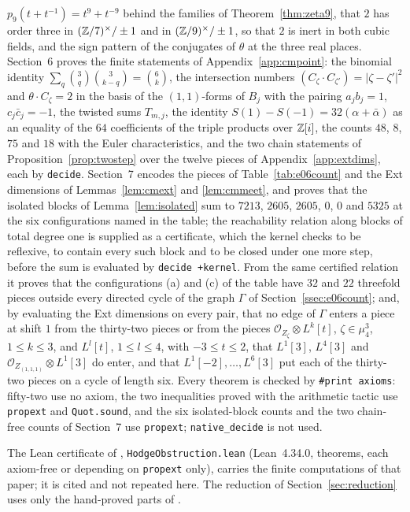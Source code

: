 $p_{9}(t+t^{-1})=t^{9}+t^{-9}$ behind the families of Theorem~\ref{thm:zeta9}, that $2$ has order three in $(\mathbb{Z}/7)^{\times}/\pm1$ and in $(\mathbb{Z}/9)^{\times}/\pm1$, so that $2$ is inert in both cubic fields, and the sign pattern of the conjugates of $\theta$ at the three real places. Section~6 proves the finite statements of Appendix~\ref{app:cmpoint}: the binomial identity $\sum_{q}\binom{3}{q}\binom{3}{k-q}=\binom{6}{k}$, the intersection numbers $(C_{\zeta}\cdot C_{\zeta'})=|\zeta-\zeta'|^{2}$ and $\theta\cdot C_{\zeta}=2$ in the basis of the $(1,1)$-forms of $B_{j}$ with the pairing $a_{j}b_{j}=1$, $c_{j}\bar c_{j}=-1$, the twisted sums $T_{m,j}$, the identity $S(1)-S(-1)=32(\alpha+\bar\alpha)$ as an equality of the $64$ coefficients of the triple products over $\mathbb{Z}[i]$, the counts $48$, $8$, $75$ and $18$ with the Euler characteristics, and the two chain statements of Proposition~\ref{prop:twostep} over the twelve pieces of Appendix~\ref{app:extdims}, each by \texttt{decide}. Section~7 encodes the pieces of Table~\ref{tab:e06count} and the Ext dimensions of Lemmas~\ref{lem:cmext} and \ref{lem:cmmeet}, and proves that the isolated blocks of Lemma~\ref{lem:isolated} sum to $7213$, $2605$, $2605$, $0$, $0$ and $5325$ at the six configurations named in the table; the reachability relation along blocks of total degree one is supplied as a certificate, which the kernel checks to be reflexive, to contain every such block and to be closed under one more step, before the sum is evaluated by \texttt{decide\,+kernel}. From the same certified relation it proves that the configurations (a) and (c) of the table have $32$ and $22$ threefold pieces outside every directed cycle of the graph $\Gamma$ of Section~\ref{ssec:e06count}; and, by evaluating the Ext dimensions on every pair, that no edge of $\Gamma$ enters a piece at shift $1$ from the thirty-two pieces or from the pieces $\mathcal{O}_{Z_{\zeta}}\otimes L^{k}[t]$, $\zeta\in\mu_{4}^{3}$, $1\le k\le3$, and $L^{l}[t]$, $1\le l\le4$, with $-3\le t\le2$, that $L^{1}[3]$, $L^{4}[3]$ and $\mathcal{O}_{Z_{(1,1,1)}}\otimes L^{1}[3]$ do enter, and that $L^{1}[-2],\dots,L^{6}[3]$ put each of the thirty-two pieces on a cycle of length six. Every theorem is checked by \texttt{\#print\,axioms}: fifty-two use no axiom, the two inequalities proved with the arithmetic tactic use \texttt{propext} and \texttt{Quot.sound}, and the six isolated-block counts and the two chain-free counts of Section~7 use \texttt{propext}; \texttt{native\_decide} is not used.

The Lean certificate of \cite{BMB26}, \texttt{HodgeObstruction.lean} (Lean~4.34.0, \leancount{} theorems, each axiom-free or depending on \texttt{propext} only), carries the finite computations of that paper; it is cited and not repeated here. The reduction of Section~\ref{sec:reduction} uses only the hand-proved parts of \cite{BMB26}.

